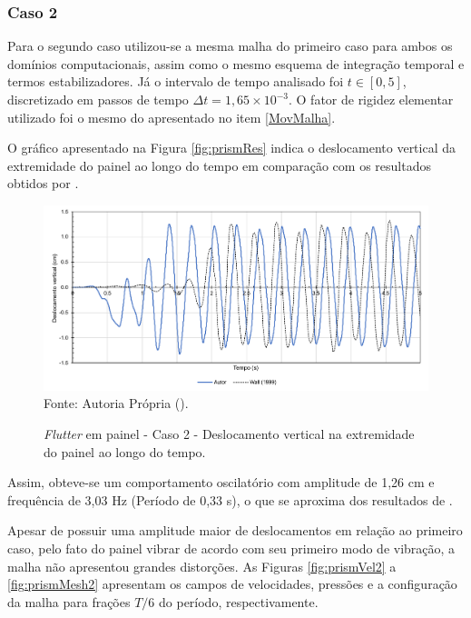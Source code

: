 \subsubsection{Caso 2}

Para o segundo caso utilizou-se a mesma malha do primeiro caso para ambos os domínios computacionais, assim como o mesmo esquema de integração temporal e termos estabilizadores. Já o intervalo de tempo analisado foi $t\in[0,5]$, discretizado em passos de tempo $\Delta t=1,65\times10^{-3}$. O fator de rigidez elementar utilizado foi o mesmo do apresentado no item \ref{MovMalha}.

O gráfico apresentado na Figura \ref{fig:prismRes} indica o deslocamento vertical da extremidade do painel ao longo do tempo em comparação com os resultados obtidos por .

\begin{figure}[h!]
    \centering
    \caption{\textit{Flutter} em painel - Caso 2 - Deslocamento vertical na extremidade do painel ao longo do tempo.}
    \includegraphics[width=\linewidth]{Figuras/FSI-prism2/results.pdf}
    \\Fonte: Autoria Própria (\the\year).
    \label{fig:prismRes2}
\end{figure}

Assim, obteve-se um comportamento oscilatório com amplitude de 1,26 cm e frequência de 3,03 Hz (Período de 0,33 s), o que se aproxima dos resultados de .

Apesar de possuir uma amplitude maior de deslocamentos em relação ao primeiro caso, pelo fato do painel vibrar de acordo com seu primeiro modo de vibração, a malha não apresentou grandes distorções. As Figuras \ref{fig:prismVel2} a \ref{fig:prismMesh2} apresentam os campos de velocidades, pressões e a configuração da malha para frações $T/6$ do período, respectivamente.

